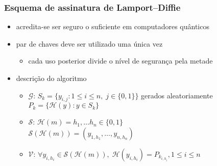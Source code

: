\documentclass{beamer}
\begin{document}
\begin{frame}
  \frametitle{Esquema de assinatura de Lamport--Diffie \cite{Lamport1979}}
  \begin{itemize}
    \item acredita-se ser seguro o suficiente em computadores quânticos
    \item par de chaves deve ser utilizado uma única vez
    \begin{itemize}
      \item cada uso posterior divide o nível de segurança pela metade
    \end{itemize}
    \item descrição do algoritmo
    \begin{itemize}
      \item $\mathcal{G}$: $S_{k} = \{y_{i, j} : 1 \leq i \leq n, \;
        j \in \{0, 1\}\}$ gerados aleatoriamente \\
        \hspace{1.3em}$P_{k} = \{\mathcal{H}(y) : y \in S_{k}\}$
      \item $\mathcal{S}$: $\mathcal{H}(m)
        = h_{1}, \dots h_{n} \in \{0, 1\}$ \\
        \hspace{1.3em}$\mathcal{S}(\mathcal{H}(m))
          = (y_{1, h_{1}}, \dots, y_{n, h_{n}})$
      \item $\mathcal{V}$:
        $\forall y_{i, h_{i}} \in \mathcal{S}(\mathcal{H}(m)), \;
          \mathcal{H}(y_{i, h_{i}}) = P_{k_{i, h_{i}}}, 1 \leq i \leq n$
    \end{itemize}
  \end{itemize}
\end{frame}
\end{document}
